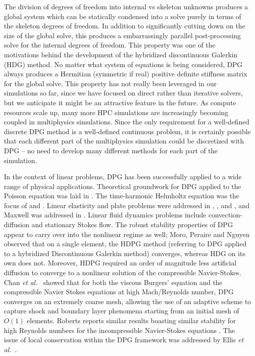 \documentclass[letterpaper,12pt]{article}
\def\etal{{\it et al.~}}
\begin{document}
The division of degrees of freedom into internal vs skeleton unknowns produces a global system which can be statically condensed into 
a solve purely in terms of the skeleton degrees of freedom.
In addition to significantly cutting down on the size of the global solve, 
this produces a embarrassingly parallel post-processing solve for the internal degrees of freedom.
This property was one of the motivations behind the development of the hybridized discontinuous Galerkin (HDG) \cite{HDG} method.
No matter what system of equations is being considered, DPG always produces a Hermitian (symmetric if real) 
positive definite stiffness matrix for the global solve.
This property has not really been leveraged in our simulations so far, since we have focused on direct rather than iterative solvers, but we
anticipate it might be an attractive feature in the future.
As compute resources scale up, many more HPC simulations are increasingly becoming coupled in multiphysics simulations.
Since the only requirement for a well-defined discrete DPG method is a well-defined continuous problem, it is certainly possible that each different part of the multiphysics simulation could be discretized with DPG -- no need to develop many different methods for each part of the simulation.

In the context of linear problems, DPG has been successfully applied to a wide range of physical applications.  
Theoretical groundwork for DPG applied to the Poisson equation was laid in \cite{DPGPoisson}.  The time-harmonic Helmholtz equation was the focus of \cite{DPGHelmholtz, Gopalakrishnan2014} and \cite{DPG4}.  Linear elasticity and plate problems were addressed in \cite{BramwellDPG}, \cite{NiemiBramwellDemkowicz10}, and \cite{BramwellDemkowiczQiu10}, and Maxwell was addressed in \cite{DPGCloaking, WohlmuthReport}.  Linear fluid dynamics problems include convection-diffusion \cite{DPG3,DemkowiczHeuer,ChanHeuerThanhDemkowicz2012,Chan2013,EllisLC} and stationary Stokes flow\cite{DPGStokes,EllisLC}.
The robust stability properties of DPG appear to carry over into the nonlinear regime as well; Moro, Peraire and Nguyen observed \cite{MoroNguyenPeraire11, MoroMastersThesis} that on a single element, the HDPG method (referring to DPG applied to a hybridized Discontinuous Galerkin method) converges, whereas HDG on its own does not.  Moreover, HDPG required an order of magnitude less artificial diffusion to converge to a nonlinear solution of the compressible Navier-Stokes.  Chan \etal \cite{Chan2013dpg} showed that for both the viscous Burgers' equation and the compressible Navier Stokes equations at high Mach/Reynolds number, DPG converges on an extremely coarse mesh, allowing the use of an adaptive scheme to capture shock and boundary layer phenomena starting from an initial mesh of $O(1)$ elements.  Roberts reports similar results boasting similar stability for high Reynolds numbers for the incompressible Navier-Stokes equations \cite{NateDissertation}.  
The issue of local conservation within the DPG framework was addressed by Ellis \etal \cite{EllisLC}.
\end{document}
